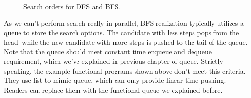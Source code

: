 \documentclass[UTF8]{article}
\begin{document}
\begin{figure}[htbp]
 \centering
 \caption{Search orders for DFS and BFS.}
 \label{fig:dfs-bfs-tree}
\end{figure}

As we can't perform search really in parallel, BFS realization typically utilizes a queue
to store the search options. The candidate with less steps pops from the head, while
the new candidate with more steps is pushed to the tail of the queue. Note that the
queue should meet constant time enqueue and dequeue requirement, which we've explained
in previous chapter of queue. Strictly speaking, the example functional programs shown above
don't meet this criteria. They use list to mimic queue, which can only provide
linear time pushing. Readers can replace them with the functional queue we explained
before.
\end{document}
